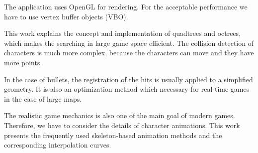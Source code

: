 The application uses OpenGL for rendering. For the acceptable performance we have to use vertex buffer objects (VBO).

This work explains the concept and implementation of quadtrees and octrees, which makes the searching in large game space efficient. The collision detection of characters is much more complex, because the characters can move and they have more points.

In the case of bullets, the registration of the hits is usually applied to a simplified geometry. It is also an optimization method which necessary for real-time games in the case of large maps.

The realistic game mechanics is also one of the main goal of modern games. Therefore, we have to consider the details of character animations. This work presents the frequently used skeleton-based animation methods and the corresponding interpolation curves.
